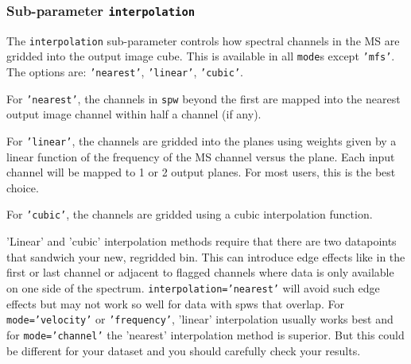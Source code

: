 
\subsubsection{Sub-parameter {\tt interpolation} }
\label{section:im.pars.mode.interpolation}

The {\tt interpolation} sub-parameter controls how spectral channels
in the MS are gridded into the output image cube.  This is available 
in all {\tt mode}s except {\tt 'mfs'}.  The options are: 
{\tt 'nearest'}, {\tt 'linear'}, {\tt 'cubic'}.

For {\tt 'nearest'}, the channels in {\tt spw} beyond the first are
mapped into the nearest output image channel within half a channel (if
any).

For {\tt 'linear'}, the channels are gridded into the planes using
weights given by a linear function of the frequency of the MS channel
versus the plane.  Each input channel will be mapped to 1 or 2 output
planes.  For most users, this is the best choice.

For {\tt 'cubic'}, the channels are gridded using a cubic
interpolation function. 

'Linear' and 'cubic' interpolation methods require that there are two
datapoints that sandwich your new, regridded bin. This can introduce
edge effects like in the first or last channel or adjacent to flagged
channels where data is only available on one side of the
spectrum. {\tt interpolation='nearest'} will avoid such edge effects
but may not work so well for data with spws that overlap. For {\tt
  mode='velocity'} or {\tt 'frequency'}, 'linear' interpolation
usually works best and for {\tt mode='channel'} the 'nearest'
interpolation method is superior. But this could be different
for your dataset and you should carefully check your results.

